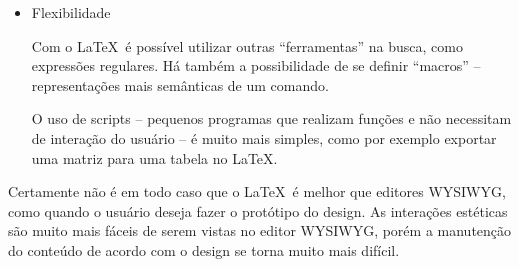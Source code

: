 \documentclass[10pt]{article}
\begin{document}
\begin{itemize}
\item Flexibilidade

Com o \LaTeX\ é possível utilizar outras ``ferramentas'' na busca, como expressões regulares. Há também a possibilidade de se definir ``macros'' -- representações mais semânticas de um comando. 

O uso de scripts -- pequenos programas que realizam funções e não necessitam de interação do usuário -- é muito mais simples, como por exemplo exportar uma matriz para uma tabela no \LaTeX.


\end{itemize}

Certamente não é em todo caso que o \LaTeX\ é melhor que editores WYSIWYG, como quando o usuário deseja fazer o protótipo do design. As interações estéticas são muito mais fáceis de serem vistas no editor WYSIWYG, porém a manutenção do conteúdo de acordo com o design se torna muito mais difícil. 
\end{document}
